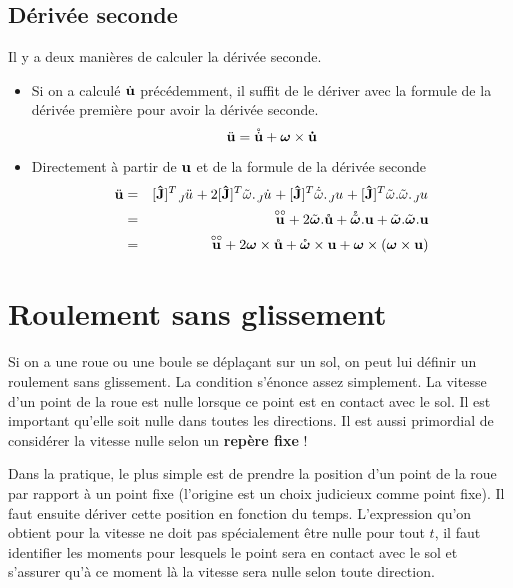 \documentclass[11pt,a4paper]{article} %
\newcommand\fv[1]{{\bf #1}} %
\newcommand\fvd[1]{\dot{\bf #1}} %
\newcommand\fvdd[1]{\ddot{\bf #1}} %
\newcommand\fvr[1]{\mathring{\bf #1}} %
\newcommand\fvrr[1]{\overset{\circ\circ}{\bf #1}} %
\newcommand\uj{{\bf\hat{J}}} %
\newcommand\wrt[2]{\tensor*[_{ #1}]{ #2}{}} %
\newcommand\omegaf{{\bm \omega}}
\newcommand\omegafr{\mathring{\bm \omega}}
\newcommand\omegaft{\tilde{\bm \omega}}
\newcommand\omegaftr{\mathring{\tilde{\bm \omega}}}
\newcommand\omegat{\tilde{\omega}}
\begin{document}
\subsection{Dérivée seconde}
Il y a deux manières de calculer la dérivée seconde.
\begin{itemize}
	\item
		Si on a calculé $\fvd{u}$ précédemment, il suffit de le dériver avec la formule de la dérivée première pour avoir la dérivée seconde.
		\[ \fvdd{u} = \mathring{\fvd{u}} + \omegaf \times \fvd{u} \]
	\item
		Directement à partir de $\fv{u}$ et de la formule de la dérivée seconde
		\begin{eqnarray*}
			\fvdd{u} &=&  [\uj]^T \wrt{J}{\ddot{u}} + 2 [\uj]^T \omegat.\wrt{J}{\dot{u}} + [\uj]^T \dot{\omegat}.\wrt{J}{u} + [\uj]^T \omegat.\omegat.\wrt{J}{u}\\
			&=& \fvrr{u} + 2 \omegaft . \fvr{u} + \omegaftr . \fv{u} + \omegaft . \omegaft . \fv{u}\\
			&=& \fvrr{u} + 2 \omegaf \times \fvr{u} + \omegafr \times \fv{u} + \omegaf \times (\omegaf \times \fv{u})
		\end{eqnarray*}
\end{itemize}

\section{Roulement sans glissement}

Si on a une roue ou une boule se déplaçant sur un sol, on peut lui définir un roulement sans glissement.
La condition s'énonce assez simplement.
La vitesse d'un point de la roue est nulle lorsque ce point est en contact avec le sol.
Il est important qu'elle soit nulle dans toutes les directions.
Il est aussi primordial de considérer la vitesse nulle selon un {\bf repère fixe} !

Dans la pratique, le plus simple est de prendre la position d'un point de la roue par rapport à un point fixe (l'origine est un choix judicieux comme point fixe).
Il faut ensuite dériver cette position en fonction du temps. L'expression qu'on obtient pour la vitesse ne doit pas spécialement être nulle pour tout $t$, il faut identifier les moments pour lesquels le point sera en contact avec le sol et s'assurer qu'à ce moment là la vitesse sera nulle selon toute direction.
\end{document}
